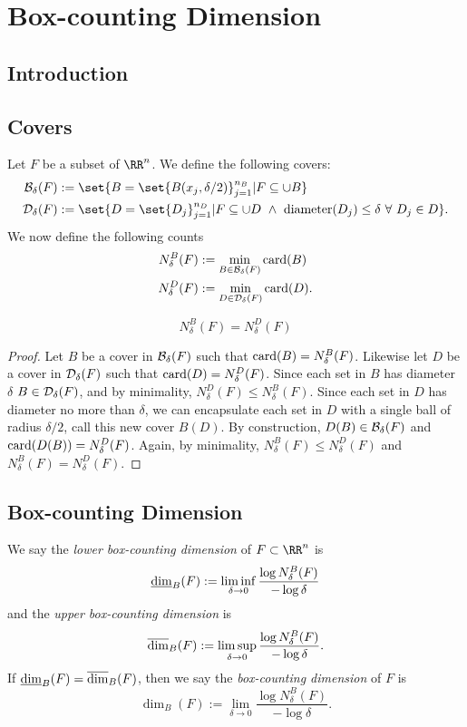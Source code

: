
\chapter{Box-counting Dimension}

\section{Introduction}

\section{Covers}

Let $F$ be a subset of $\RR^n$.
We define the following covers:
\begin{align*}
	\mcb_\delta(F)&:=\set{B=\set{B(x_j,\delta/2)}_{j=1}^{n_B}| F\subseteq \cup B}\\
	\mcd_\delta(F)&:=\set{D=\set{D_j}_{j=1}^{n_D}| F\subseteq \cup D \,\,\wedge\,\, \diam(D_j)\leq\delta\,\, \forall\,\, D_j\in D}.
\end{align*}
We now define the following counts
\begin{align*}
	N^B_\delta(F)&:=\min\limits_{B\in\mathcal{B}_\delta(F)}\operatorname{card}(B)\\
	N^D_\delta(F)&:=\min\limits_{D\in\mathcal{D}_\delta(F)}\operatorname{card}(D).
\end{align*}

\begin{thm}
	\[
		N^B_\delta(F)=N^D_\delta(F)
	\]
\end{thm}
\begin{proof}
	Let $B$ be a cover in $\mathcal{B}_\delta(F)$ such that $\operatorname{card}(B)=N^B_\delta(F)$.
	Likewise let $D$ be a cover in $\mathcal{D}_\delta(F)$ such that $\operatorname{card}(D)=N^D_\delta(F)$.
	Since each set in $B$ has diameter $\delta$ $B\in\mathcal{D}_\delta(F)$, and by minimality, $N^D_\delta(F)\leq N^B_\delta(F)$.
	Since each set in $D$ has diameter no more than $\delta$, we can encapsulate each set in $D$ with a single ball of radius $\delta/2$, call this new cover $B(D)$.
	By construction, $D(B)\in\mathcal{B}_\delta(F)$ and $\operatorname{card}(D(B))=N^D_\delta(F)$.
	Again, by minimality, $N^B_\delta(F)\leq N^D_\delta(F)$ and $N^B_\delta(F) = N^D_\delta(F)$.
\end{proof}

\section{Box-counting Dimension}

\begin{definition}
	We say the \textit{lower box-counting dimension} of $F\subset\RR^n$ is
	\[
		\underline{\operatorname{dim}}_B(F):=\liminf\limits_{\delta\rightarrow 0} \frac{\log N^B_\delta(F)}{-\log\delta}
	\]
	and the \textit{upper box-counting dimension} is
	\[
		\overline{\operatorname{dim}}_B(F):=\limsup\limits_{\delta\rightarrow 0} \frac{\log N^B_\delta(F)}{-\log\delta}.
	\]
	If $\underline{\operatorname{dim}}_B(F)=\overline{\operatorname{dim}}_B(F)$, then we say the \textit{box-counting dimension} of $F$ is
	\[
		\dim_B(F):=\lim\limits_{\delta\rightarrow 0} \frac{\log N^B_\delta(F)}{-\log\delta}.
	\]
\end{definition}


